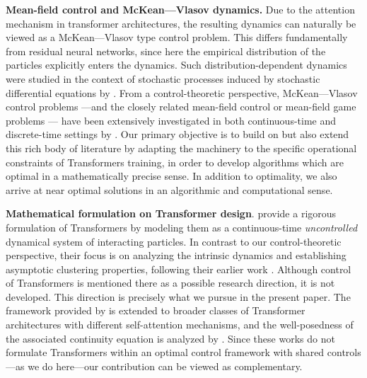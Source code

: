 \documentclass[11pt]{article}
\begin{document}
\noindent\textbf{Mean-field control and McKean---Vlasov dynamics.} Due to the attention mechanism in transformer architectures, the resulting dynamics can naturally be viewed as a McKean---Vlasov type control problem. This differs fundamentally from residual neural networks, since here the empirical distribution of the particles explicitly enters the dynamics. Such distribution-dependent dynamics were studied in the context of stochastic processes induced by stochastic differential equations by \cite{mckean1966class}. From a control-theoretic perspective, McKean---Vlasov control problems —and the closely related mean-field control or mean-field game problems — have been extensively investigated in both continuous-time and discrete-time settings by \cite{bayraktar2018randomized,carmona2015forward,carmona2013control,motte2022mean,pham2017dynamic,pham2016discrete,PY25MckeanVA}. Our primary objective is to build on but also extend this rich body of literature by adapting the machinery to the specific operational constraints of Transformers training, in order to develop algorithms which are optimal in a mathematically precise sense. In addition to optimality, we also arrive at near optimal solutions in an algorithmic and computational sense.
\medskip

\noindent\textbf{Mathematical formulation on Transformer design}. \cite{geshkovski2025mathematical} provide a rigorous formulation of Transformers by modeling them as a continuous-time \emph{uncontrolled} dynamical system of interacting particles. In contrast to our control-theoretic perspective, their focus is on analyzing the intrinsic dynamics and establishing asymptotic clustering properties, following their earlier work \citep{geshkovski2023emergence}. Although control of Transformers is mentioned there as a possible research direction, it is not developed. This direction is precisely what we pursue in the present paper.
The framework provided by \cite{geshkovski2025mathematical} is extended to broader classes of Transformer architectures with different self-attention mechanisms, and the well-posedness of the associated continuity equation is analyzed by \cite{castin2025unified}. Since these works do not formulate Transformers within an optimal control framework with shared controls—as we do here—our contribution can be viewed as complementary. %
\medskip
\end{document}
